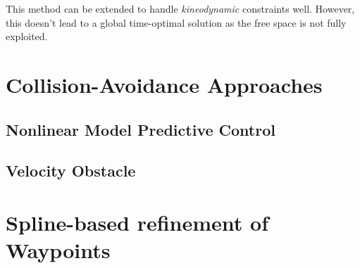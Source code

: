 This method can be extended to handle \textit{kineodynamic} constraints well. However, this doesn't lead to a global time-optimal solution as the free space is not fully exploited.
\section{Collision-Avoidance Approaches}
\subsection{Nonlinear Model Predictive Control}
\subsection{Velocity Obstacle}

\section{Spline-based refinement of Waypoints}
